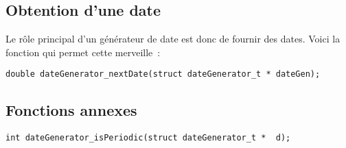 %
\subsection{Obtention d'une date}

   Le rôle principal d'un générateur de date est donc de fournir des
dates. Voici la fonction qui permet cette merveille~:

\begin{verbatim}
double dateGenerator_nextDate(struct dateGenerator_t * dateGen);
\end{verbatim}

%
\subsection{Fonctions annexes}

\begin{verbatim}
int dateGenerator_isPeriodic(struct dateGenerator_t *  d);
\end{verbatim}


